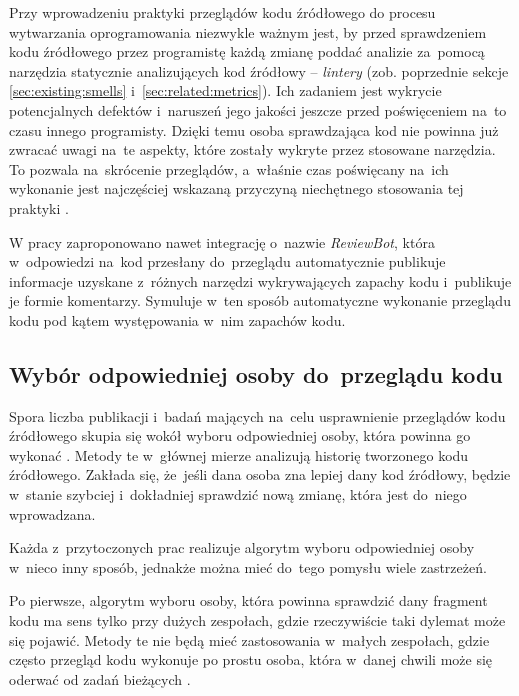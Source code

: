 \documentclass[twoside]{praca}
\begin{document}
Przy wprowadzeniu praktyki przeglądów kodu źródłowego do procesu wytwarzania oprogramowania niezwykle ważnym jest, by przed sprawdzeniem kodu źródłowego przez programistę każdą zmianę poddać analizie za~pomocą narzędzia statycznie analizujących kod źródłowy -- \textit{lintery} (zob. poprzednie sekcje \ref{sec:existing:smells} i~\ref{sec:related:metrics}). Ich zadaniem jest wykrycie potencjalnych defektów i~naruszeń jego jakości jeszcze przed poświęceniem na~to czasu innego programisty. Dzięki temu osoba sprawdzająca kod nie powinna już zwracać uwagi na~te aspekty, które zostały wykryte przez stosowane narzędzia. To pozwala na~skrócenie przeglądów, a~właśnie czas poświęcany na~ich wykonanie jest najczęściej wskazaną przyczyną niechętnego stosowania tej praktyki \cite{cohen2006best, fatima2018challenges}. 

W pracy \cite{balachandran2013reducing} zaproponowano nawet integrację o~nazwie \textit{ReviewBot}, która w~odpowiedzi na~kod przesłany do~przeglądu automatycznie publikuje informacje uzyskane z~różnych narzędzi wykrywających zapachy kodu i~publikuje je formie komentarzy. Symuluje w~ten sposób automatyczne wykonanie przeglądu kodu pod kątem występowania w~nim zapachów kodu.

\subsection{Wybór odpowiedniej osoby do~przeglądu kodu}

Spora liczba publikacji i~badań mających na~celu usprawnienie przeglądów kodu źródłowego skupia się wokół wyboru odpowiedniej osoby, która powinna go wykonać \cite{thongtanunam2015should, balachandran2018automatic, yang2018revrec, lipcak2018large, rahman2016correct}. Metody te w~głównej mierze analizują historię tworzonego kodu źródłowego. Zakłada się, że~jeśli dana osoba zna lepiej dany kod źródłowy, będzie w~stanie szybciej i~dokładniej sprawdzić nową zmianę, która jest do~niego wprowadzana. 

Każda z~przytoczonych prac realizuje algorytm wyboru odpowiedniej osoby w~nieco inny sposób, jednakże można mieć do~tego pomysłu wiele zastrzeżeń. 

Po pierwsze, algorytm wyboru osoby, która powinna sprawdzić dany fragment kodu ma sens tylko przy dużych zespołach, gdzie rzeczywiście taki dylemat może się pojawić. Metody te nie będą mieć zastosowania w~małych zespołach, gdzie często przegląd kodu wykonuje po prostu osoba, która w~danej chwili może się oderwać od zadań bieżących \cite{cohen2006best}.
\end{document}
